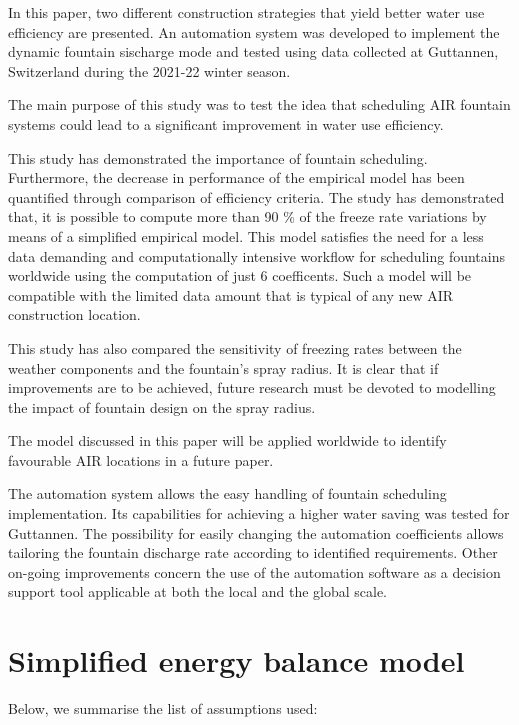 \documentclass[tc, manuscript]{copernicus}
\begin{document}
\conclusions

In this paper, two different construction strategies that yield better water use efficiency are presented.
An automation system was developed to implement the dynamic fountain sischarge mode and tested using data
collected at Guttannen, Switzerland during the 2021-22 winter season. 

The main purpose of this study was to test the idea that scheduling AIR fountain systems could lead to a
significant improvement in water use efficiency.

This study has demonstrated the importance of fountain scheduling. Furthermore, the decrease in performance of
the empirical model has been quantified through comparison of efficiency criteria. The study has demonstrated
that, it is possible to compute more than 90 \% of the freeze rate variations by means of a simplified empirical
model. This model satisfies the need for a less data demanding and computationally intensive workflow for
scheduling fountains worldwide using the computation of just 6 coefficents. Such a model will be compatible with
the limited data amount that is typical of any new AIR construction location.

This study has also compared the sensitivity of freezing rates between the weather components and the fountain's
spray radius. It is clear that if improvements are to be achieved, future research must be devoted to modelling
the impact of fountain design on the spray radius.

The model discussed in this paper will be applied worldwide to identify favourable AIR locations in a future
paper.


The automation system allows the easy handling of fountain scheduling implementation. Its capabilities for
achieving a higher water saving was tested for Guttannen. The possibility for easily changing the automation
coefficients allows tailoring the fountain discharge rate according to identified requirements. Other on-going
improvements concern the use of the automation software as a decision support tool applicable at both the local
and the global scale.



\appendix

\section{Simplified energy balance model}

Below, we summarise the list of assumptions used:
\end{document}
